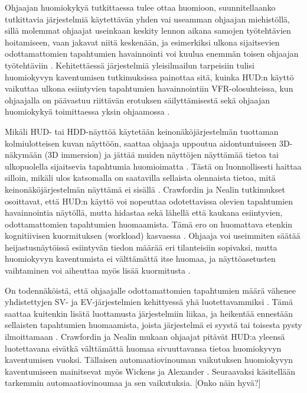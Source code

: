 \documentclass[utf8,bachelor,manualbib]{gradu3}
\begin{document}
Ohjaajan huomiokykyä tutkittaessa tulee ottaa huomioon, suunnitellaanko tutkittavia järjestelmiä käytettävän yhden vai useamman ohjaajan miehistöllä, sillä molemmat ohjaajat useinkaan keskity lennon aikana samojen työtehtävien hoitamiseen, vaan jakavat niitä keskenään, ja esimerkiksi ulkona sijaitsevien odottamattomien tapahtumien havainnointi voi kuulua enemmän toisen ohjaajan työtehtäviin \citep{crawfordneal2006}. Kehitettäessä järjestelmiä yleisilmailun tarpeisiin tulisi huomiokyvyn kaventumisen tutkimuksissa painottaa sitä, kuinka HUD:n käyttö vaikuttaa ulkona esiintyvien tapahtumien havainnointiin VFR-olosuhteissa, kun ohjaajalla on päävastuu riittävän erotuksen säilyttämisestä \citep{ververswickens1998} sekä ohjaajan huomiokykyä toimittaessa yksin ohjaamossa \citep{crawfordneal2006}. 

Mikäli HUD- tai HDD-näyttöä käytetään keinonäköjärjestelmän tuottaman kolmiulotteisen kuvan näyttöön, saattaa ohjaaja uppoutua aidontuntuiseen 3D-näkymään (3D immersion) ja jättää muiden näyttöjen näyttämää tietoa tai ulkopuolella sijaitsevia tapahtumia huomioimatta \citep{olmosym2000}. Tästä on luonnollisesti haittaa silloin, mikäli ulos katsomalla on saatavilla sellaista olennaista tietoa, mitä keinonäköjärjestelmän näyttämä ei sisällä \citep{foylehooey2003}. Crawfordin ja Nealin \citeyearpar{crawfordneal2006} tutkimukset osoittavat, että HUD:n käyttö voi nopeuttaa odotettavissa olevien tapahtumien havainnointia näytöllä, mutta hidastaa sekä lähellä että kaukana esiintyvien, odottamattomien tapahtumien huomaamista. Tämä ero on huomattava etenkin kognitiivisen kuormituksen (workload) kasvaessa \citep{larishwickens1991}. Ohjaaja voi useimmiten säätää heijastusnäytöissä esiintyvän tiedon määrää eri tilanteisiin sopivaksi, mutta huomiokyvyn kaventumista ei välttämättä itse huomaa, ja näyttöasetusten vaihtaminen voi aiheuttaa myös lisää kuormitusta \citep{kimkaber2014}.

On todennäköistä, että ohjaajalle odottamattomien tapahtumien määrä vähenee yhdistettyjen SV- ja EV-järjestelmien kehittyessä yhä luotettavammiksi \citep{kornym2009}. Tämä saattaa kuitenkin lisätä luottamusta järjestelmiin liikaa, ja heikentää ennestään sellaisten tapahtumien huomaamista, joista järjestelmä ei syystä tai toisesta pysty ilmoittamaan \citep{molloyparasuraman1996}. Crawfordin ja Nealin \citeyearpar{crawfordneal2006} mukaan ohjaajat pitävät HUD:a yleensä luotettavana eivätkä välttämättä huomaa sivuuttavansa tietoa huomiokyvyn kaventumisen vuoksi. Tällaisen automaatiovinouman \citep{mosierym1998} vaikutuksen huomiokyvyn kaventumiseen mainitsevat myös Wickens ja Alexander \citeyearpar{wickensalexander2009}. Seuraavaksi käsitellään tarkemmin automaatiovinoumaa ja sen vaikutuksia. [Onko näin hyvä?]
\end{document}
